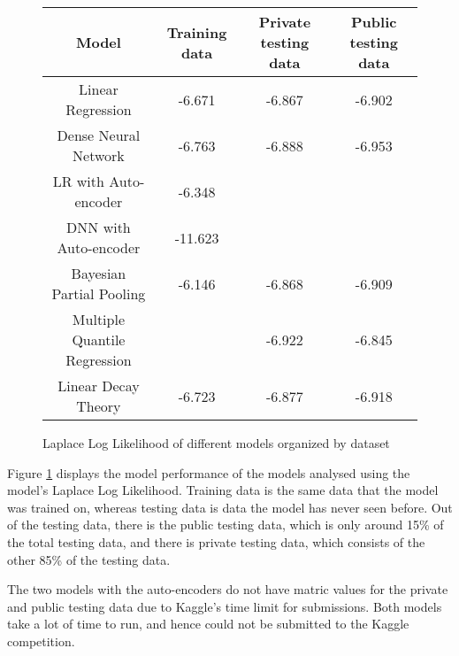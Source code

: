 \documentclass[12pt]{article}
\begin{document}
\begin{figure}[h!]
    \centering
    \begin{tabular}{ | c | c | c | c | }
        \hline
        Model & Training data & Private testing data & Public testing data \\ 
        \hline
        \hline
        Linear Regression & -6.671 & -6.867 & -6.902 \\ 
        \hline 
        Dense Neural Network & -6.763 & -6.888 & -6.953 \\
        \hline
        LR with Auto-encoder & -6.348 &  &  \\
        \hline
        DNN with Auto-encoder & -11.623 &  &  \\
        \hline
        Bayesian Partial Pooling & -6.146 & -6.868 & -6.909 \\
        \hline
        Multiple Quantile Regression &  & -6.922 & -6.845 \\
        \hline
        Linear Decay Theory & -6.723 & -6.877 & -6.918 \\
        \hline
    \end{tabular}

    \caption{Laplace Log Likelihood of different models organized by dataset}
    \label{Model Performances}
\end{figure}

Figure \ref{Model Performances} displays the model performance of the models analysed using the model's Laplace Log Likelihood.
Training data is the same data that the model was trained on, whereas testing data is data the model has never seen before. 
Out of the testing data, there is the public testing data, which is only around 15\% of the total testing data, and there is private testing data, which consists of the other 85\% of the testing data.

The two models with the auto-encoders do not have matric values for the private and public testing data due to Kaggle's time limit for submissions.
Both models take a lot of time to run, and hence could not be submitted to the Kaggle competition.
\end{document}
